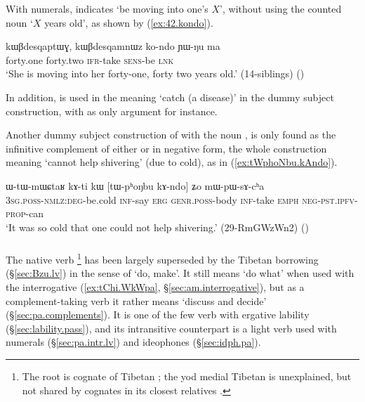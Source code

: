 With numerals,  indicates `be moving into one's $X$', without using the counted noun  `$X$ years old', as shown by (\ref{ex:42.kondo}).

\begin{exe}
\ex \label{ex:42.kondo}
\gll  kɯβdesqaptɯɣ, kɯβdesqamnɯz ko-ndo ɲɯ-ŋu ma \\
forty.one forty.two \textsc{ifr}-take \textsc{sens}-be \textsc{lnk} \\ 
\glt `She is moving into her forty-one, forty two years old.' (14-siblings)
()
 \end{exe}
  
In addition,  is used in the meaning `catch (a disease)' in the dummy subject construction, with  as only argument for instance.
 
Another dummy subject construction of  with  the noun ,  is only found as the infinitive complement of either  or  in negative form, the whole construction meaning `cannot help shivering' (due to cold), as in (\ref{ex:tWphoNbu.kAndo}). 

\begin{exe}
\ex \label{ex:tWphoNbu.kAndo}
\gll  ɯ-tɯ-mɯɕtaʁ kɤ-ti kɯ [tɯ-pʰoŋbu kɤ-ndo] ʑo mɯ-pɯ-sɤ-cʰa \\
\textsc{3sg}.\textsc{poss}-\textsc{nmlz}:\textsc{deg}-be.cold \textsc{inf}-say \textsc{erg} \textsc{genr}.\textsc{poss}-body \textsc{inf}-take \textsc{emph} \textsc{neg}-\textsc{pst}.\textsc{ipfv}-\textsc{prop}-can \\
\glt `It was so cold that one could not help shivering.' (29-RmGWzWn2)
()
\end{exe} 

 \subsubsection{ } \label{sec:pa.lv}
The native verb \footnote{The root  is cognate of Tibetan ; the yod medial Tibetan is unexplained, but not shared by cognates in its closest relatives \citep{jacques13yod}. } has been largely superseded by the Tibetan borrowing  (§\ref{sec:Bzu.lv}) in the sense of `do, make'. It still means `do what' when used with the interrogative  (\ref{ex:tChi.WkWpa}, §\ref{sec:am.interrogative}), but as a complement-taking verb it rather means `discuss and decide' (§\ref{sec:pa.complements}). It is one of the few verb with ergative lability (§\ref{sec:lability.pass}), and its intransitive counterpart is a light verb used with numerals (§\ref{sec:pa.intr.lv}) and ideophones (§\ref{sec:idph.pa}).

